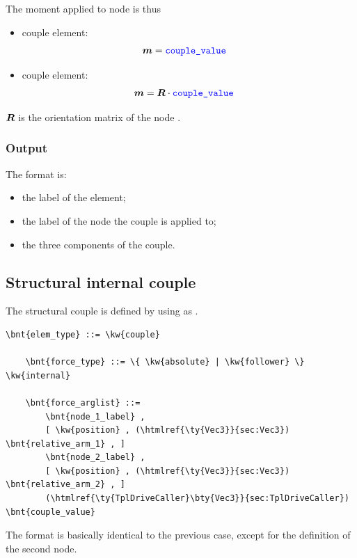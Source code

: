 The moment applied to node  is thus
\begin{itemize}
\item {} couple element:
\begin{align}
	\boldsymbol{m} & = \textcolor{blue}{\texttt{couple\_value}}
\end{align}

\item {} couple element:
\begin{align}
	\boldsymbol{m} & = \boldsymbol{R} \cdot \textcolor{blue}{\texttt{couple\_value}}
\end{align}
\end{itemize}
$\boldsymbol{R}$ is the orientation matrix of the node .

\subsubsection{Output}
The format is:
\begin{itemize}
    \item the label of the element;
    \item the label of the node the couple is applied to;
    \item the three components of the couple.
\end{itemize}

\subsection{Structural internal couple}
\label{sec:EL:FORCE:STRUCTURAL:INTERNAL_COUPLE}
The structural couple is defined by using  as .
\begin{Verbatim}[commandchars=\\\{\}]
    \bnt{elem_type} ::= \kw{couple}

    \bnt{force_type} ::= \{ \kw{absolute} | \kw{follower} \} \kw{internal}

    \bnt{force_arglist} ::=
        \bnt{node_1_label} ,
        [ \kw{position} , (\htmlref{\ty{Vec3}}{sec:Vec3}) \bnt{relative_arm_1} , ]
        \bnt{node_2_label} ,
        [ \kw{position} , (\htmlref{\ty{Vec3}}{sec:Vec3}) \bnt{relative_arm_2} , ]
        (\htmlref{\ty{TplDriveCaller}\bty{Vec3}}{sec:TplDriveCaller}) \bnt{couple_value}
\end{Verbatim}
The format is basically identical to the previous case,
except for the definition of the second node.

